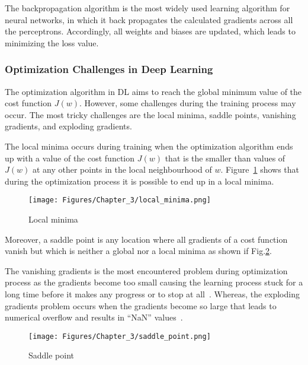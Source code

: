 The backpropagation algorithm is the most widely used learning algorithm for neural networks, in which it back propagates the calculated gradients across all the perceptrons.
Accordingly, all weights and biases are updated, which leads to minimizing the loss value.
\subsubsection{Optimization Challenges in Deep Learning}
The optimization algorithm in DL aims to reach the global minimum value of the cost function \(J(w)\).
However, some challenges during the training process may occur.
The most tricky challenges are the local minima, saddle points, vanishing gradients, and exploding gradients.

The local minima occurs during training when the optimization algorithm ends up with a value of the cost function \(J(w)\) that is the smaller than values of \(J(w)\) at any other points in the local neighbourhood of \(w\).
Figure~\ref{fig:local_minima} shows that during the optimization process it is possible to end up in a local minima.
\begin{figure}[!ht]
	\begin{center}
		\centering
		\texttt{[image: Figures/Chapter\_3/local\_minima.png]}
	\end{center}
	\caption{Local minima} 
	\label{fig:local_minima}
\end{figure}

Moreover, a saddle point is any location where all gradients of a cost function vanish but which is neither a global nor a local minima as shown if Fig.\ref{fig:saddle_point}.

The vanishing gradients is the most encountered problem during optimization process as the gradients become too small causing the learning process stuck for a long time  before it makes any progress or to stop at all~\cite{Brownlee2017a}.
Whereas, the exploding gradients problem occurs when the gradients become so large that leads to numerical overflow and results in \enquote{NaN} values~\cite{Brownlee2017a}.
\begin{figure}[!ht]
	\begin{center}
		\centering
		\texttt{[image: Figures/Chapter\_3/saddle\_point.png]}
	\end{center}
	\caption{Saddle point} 
	\label{fig:saddle_point}
\end{figure}
